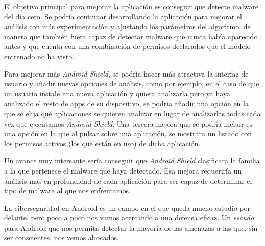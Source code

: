 El objetivo principal para mejorar la aplicación es conseguir que detecte malware del día cero. Se podría continuar desarrollando la aplicación para mejorar el análisis con más experimentación y ajustando los parámetros del algoritmo, de manera que también fuera capaz de detectar malware que nunca había aparecido antes y que cuenta con una combinación de permisos declarados que el modelo entrenado no ha visto.

Para mejorar más \textit{Android Shield}, se podría hacer más atractiva la interfaz de usuario y añadir nuevas opciones de análisis, como por ejemplo, en el caso de que un usuario instale una nueva aplicación y quiera analizarla pero ya haya analizado el resto de apps de su dispositivo, se podría añadir una opción en la que se elija qué aplicaciones se quieren analizar en lugar de analizarlas todas cada vez que ejecutamos \textit{Android Shield}. Una tercera mejora que se podría incluir es una opción en la que al pulsar sobre una aplicación, se mostrara un listado con los permisos activos (los que están en uso) de dicha aplicación.

Un avance muy intersante sería conseguir que \textit{Android Shield} clasificara la familia a la que pertenece el malware que haya detectado. Esa mejora requeriría un análisis más en profundidad de cada aplicación para ser capaz de determinar el tipo de malware al que nos enfrentamos.

La ciberseguridad en Android es un campo en el que queda mucho estudio por delante, pero poco a poco nos vamos acercando a una defensa eficaz. Un \textit{escudo} para Android que nos permita detectar la mayoría de las amenazas a las que, sin ser conscientes, nos vemos abocados.
